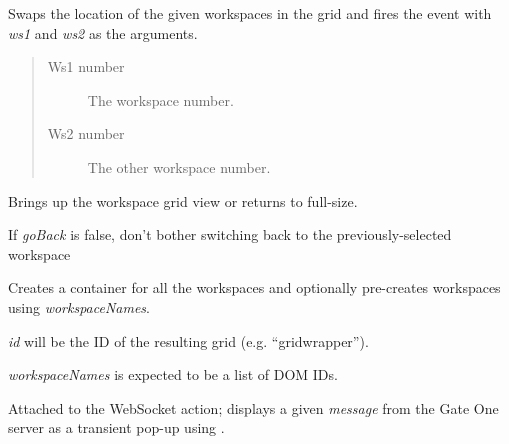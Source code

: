 \documentclass[letterpaper,10pt,openany]{sphinxmanual}
\begin{document}
\begin{fulllineitems}
\begin{fulllineitems}
\begin{fulllineitems}
\label{Developer/js_gateone:GateOne.Visual.swapWorkspaces}
Swaps the location of the given workspaces in the grid and fires the  event with \emph{ws1} and \emph{ws2} as the arguments.
\begin{quote}\begin{description}
\item[{Ws1 number}] \leavevmode
The workspace number.

\item[{Ws2 number}] \leavevmode
The other workspace number.

\end{description}\end{quote}

\end{fulllineitems}



\begin{fulllineitems}
\label{Developer/js_gateone:GateOne.Visual.toggleGridView}
Brings up the workspace grid view or returns to full-size.

If \emph{goBack} is false, don't bother switching back to the previously-selected workspace

\end{fulllineitems}



\begin{fulllineitems}
\label{Developer/js_gateone:GateOne.Visual.createGrid}
Creates a container for all the workspaces and optionally pre-creates workspaces using \emph{workspaceNames}.

\emph{id} will be the ID of the resulting grid (e.g. ``gridwrapper'').

\emph{workspaceNames} is expected to be a list of DOM IDs.

\end{fulllineitems}



\begin{fulllineitems}
\label{Developer/js_gateone:GateOne.Visual.serverMessageAction}
Attached to the  WebSocket action; displays a given \emph{message} from the Gate One server as a transient pop-up using {\hyperref[Developer/js_gateone:GateOne.Visual.displayMessage]{}}.


\end{fulllineitems}
\end{fulllineitems}
\end{fulllineitems}
\end{document}
